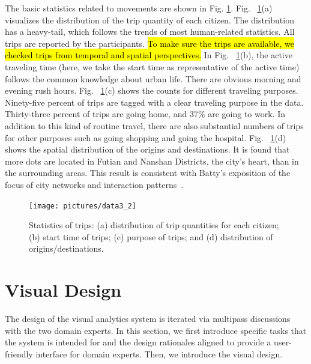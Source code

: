 \documentclass{ieeeaccess}
\begin{document}
The basic statistics related to movements are shown in Fig. \ref{fig:data_geometry}. Fig. ~\ref{fig:data_geometry}(a) visualizes the distribution of the trip quantity of each citizen. The distribution has a heavy-tail, which follows the trends of most human-related statistics. All trips are reported by the participants. \hl{To make sure the trips are available, we checked trips from temporal and spatial perspectives.} In Fig. ~\ref{fig:data_geometry}(b), the active traveling time (here, we take the start time as representative of the active time) follows the common knowledge about urban life. There are obvious morning and evening rush hours. Fig. ~\ref{fig:data_geometry}(c) shows the counts for different traveling purposes. Ninety-five percent of trips are tagged with a clear traveling purpose in the data. Thirty-three percent of trips are going home, and 37\% are going to work. In addition to this kind of routine travel, there are also substantial numbers of trips for other purposes such as going shopping and going the hospital. Fig. ~\ref{fig:data_geometry}(d) shows the spatial distribution of the origins and destinations. It is found that more dots are located in Futian and Nanshan Districts, the city's heart, than in the surrounding areas. This result is consistent with Batty's exposition of the focus of city networks and interaction patterns~\cite{batty2013new}.


\begin{figure}[htb!]
 \centering %
 \texttt{[image: pictures/data3\_2]}
 \caption{Statistics of trips: (a) distribution of trip quantities for each citizen; (b) start time of trips; (c) purpose of trips; and (d) distribution of origins/destinations. }
 \label{fig:data_geometry}
\end{figure}



\section{Visual Design}

The design of the visual analytics system is iterated via multipass discussions with the two domain experts. In this section, we first introduce specific tasks that the system is intended for and the design rationales aligned to provide a user-friendly interface for domain experts. Then, we introduce the visual design.
\end{document}
